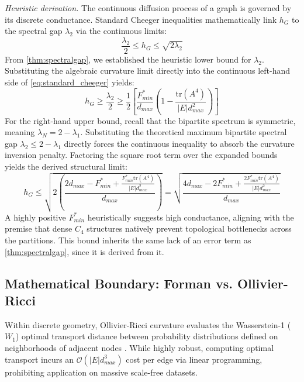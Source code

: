\documentclass{siuro250211}
\theoremstyle{remark}
\theoremstyle{plain}
\begin{document}
\smallskip
\noindent\textit{Heuristic derivation.}\quad
The continuous diffusion process of a graph is governed by its discrete conductance. Standard Cheeger inequalities mathematically link $h_G$ to the spectral gap $\lambda_2$ via the continuous limits:
\begin{equation}
\label{eq:standard_cheeger}
\frac{\lambda_2}{2} \le h_G \le \sqrt{2 \lambda_2}
\end{equation}
From \cref{thm:spectralgap}, we established the heuristic lower bound for $\lambda_2$. Substituting the algebraic curvature limit directly into the continuous left-hand side of \cref{eq:standard_cheeger} yields:
\begin{equation}
h_G \ge \frac{\lambda_2}{2} \ge \frac{1}{2} \left[ \frac{F_{min}^*}{d_{max}} \left( 1 - \frac{\text{tr}(A^4)}{|E| d_{max}^2} \right) \right]
\end{equation}
For the right-hand upper bound, recall that the bipartite spectrum is symmetric, meaning $\lambda_N = 2 - \lambda_1$. Substituting the theoretical maximum bipartite spectral gap $\lambda_2 \le 2 - \lambda_1$ directly forces the continuous inequality to absorb the curvature inversion penalty. Factoring the square root term over the expanded bounds yields the derived structural limit:
\begin{equation}
h_G \le \sqrt{2 \left( \frac{2d_{max} - F_{min}^* + \frac{F_{min}^* \text{tr}(A^4)}{|E| d_{max}^2}}{d_{max}} \right)} = \sqrt{\frac{4 d_{max} - 2F_{min}^* + \frac{2 F_{min}^* \text{tr}(A^4)}{|E| d_{max}^2}}{d_{max}}}
\end{equation}
A highly positive $F_{min}^*$ heuristically suggests high conductance, aligning with the premise that dense $C_4$ structures natively prevent topological bottlenecks across the partitions. This bound inherits the same lack of an error term as \cref{thm:spectralgap}, since it is derived from it.

\subsection{Mathematical Boundary: Forman vs. Ollivier-Ricci}
Within discrete geometry, Ollivier-Ricci curvature evaluates the Wasserstein-1 ($W_1$) optimal transport distance between probability distributions defined on neighborhoods of adjacent nodes \cite{samal2018comparative}. While highly robust, computing optimal transport incurs an $\mathcal{O}(|E| d_{max}^3)$ cost per edge via linear programming, prohibiting application on massive scale-free datasets. 
\end{document}
